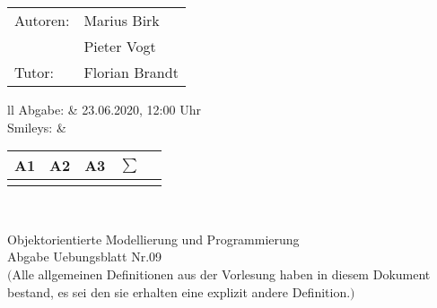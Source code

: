 \documentclass[12pt,a4paper,oneside,ngerman]{article}
\newcommand{\fach}{Objektorientierte Modellierung und Programmierung}
\newcommand{\dokumentenTitel}{Abgabe Uebungsblatt Nr.09}
\newcommand{\Abgabe}{23.06.2020, 12:00 Uhr}
\newcommand{\memberOne}{Marius Birk}
\newcommand{\memberTwo}{Pieter Vogt}
\newcommand{\tutor}{ Florian Brandt }
\begin{document}
	\thispagestyle{plain} %
	
	\begin{multicols}{2} %
		\hspace{-1cm} %
		\begin{tabular}{ll} %
			Autoren: & \memberOne \\ %
			& \memberTwo \\
			Tutor: & \tutor \\  
		\end{tabular}
		
		\columnbreak %
		\hspace{-1cm} %
		\begin{tabular}{ll} %
			Abgabe: & \Abgabe \\ %
			Smileys: &  
			\renewcommand{\arraystretch}{1.2} 
			\begin{tabular}{|p{0.8cm}|p{0.8cm}|p{0.8cm}|p{0.8cm}|p{0.8cm}|}
				\hline A1 & A2 & A3 &$\sum\limits^{ }$ \\ \hline
				& & & \\ \hline    
			\end{tabular} \\
		\end{tabular}
		
	\end{multicols} %
	
	\begin{center}
		\Large{\fach} \\
		\LARGE{\dokumentenTitel} \\
		\small
		$($Alle allgemeinen Definitionen aus der Vorlesung haben in diesem Dokument bestand, es sei den sie erhalten eine explizit andere Definition.$)$
	\end{center}
\end{document}

